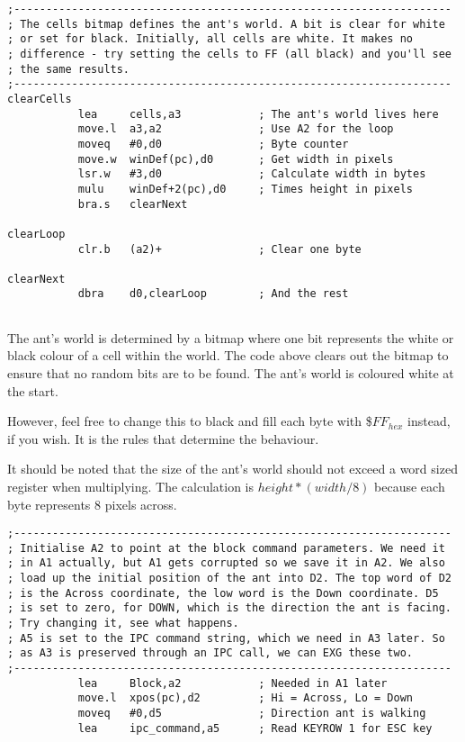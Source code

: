 \begin{lstlisting}[firstnumber=last,caption={Langtons Ant - Initialise the World}]
;--------------------------------------------------------------------
; The cells bitmap defines the ant's world. A bit is clear for white
; or set for black. Initially, all cells are white. It makes no
; difference - try setting the cells to FF (all black) and you'll see
; the same results.
;--------------------------------------------------------------------
clearCells
           lea     cells,a3            ; The ant's world lives here
           move.l  a3,a2               ; Use A2 for the loop
           moveq   #0,d0               ; Byte counter
           move.w  winDef(pc),d0       ; Get width in pixels
           lsr.w   #3,d0               ; Calculate width in bytes
           mulu    winDef+2(pc),d0     ; Times height in pixels
           bra.s   clearNext

clearLoop
           clr.b   (a2)+               ; Clear one byte

clearNext
           dbra    d0,clearLoop        ; And the rest


\end{lstlisting}

The ant's world is determined by a bitmap where one bit represents the white or black colour of a cell within the world. The code above clears out the bitmap to ensure that no random bits are to be found. The ant's world is coloured white at the start.

However, feel free to change this to black and fill each byte with \$$FF_{hex}$ instead, if you wish. It is the rules that determine the behaviour.

It should be noted that the size of the ant's world should not exceed a word sized register when multiplying. The calculation is $height * (width / 8)$ because each byte represents 8 pixels across.

\begin{lstlisting}[firstnumber=last,caption={Langtons Ant - Initialising Constants}]
;--------------------------------------------------------------------
; Initialise A2 to point at the block command parameters. We need it
; in A1 actually, but A1 gets corrupted so we save it in A2. We also
; load up the initial position of the ant into D2. The top word of D2
; is the Across coordinate, the low word is the Down coordinate. D5
; is set to zero, for DOWN, which is the direction the ant is facing.
; Try changing it, see what happens.
; A5 is set to the IPC command string, which we need in A3 later. So
; as A3 is preserved through an IPC call, we can EXG these two.
;--------------------------------------------------------------------
           lea     Block,a2            ; Needed in A1 later
           move.l  xpos(pc),d2         ; Hi = Across, Lo = Down
           moveq   #0,d5               ; Direction ant is walking
           lea     ipc_command,a5      ; Read KEYROW 1 for ESC key

\end{lstlisting}

